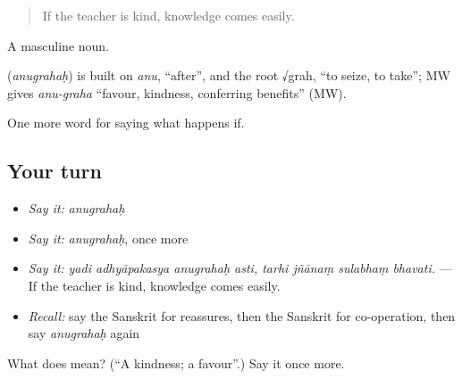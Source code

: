\begin{quote}
If the teacher is kind, knowledge comes easily.
\end{quote}

A masculine noun.

\begin{cousinweb}
\textbf{} (\emph{anugrahaḥ}) is built on \emph{anu}, \textquotedblleft{}after\textquotedblright{}, and the root √grah, \textquotedblleft{}to seize, to take\textquotedblright{}; MW gives \emph{anu-graha} \textquotedblleft{}favour, kindness, conferring benefits\textquotedblright{} (MW).
\end{cousinweb}

\begin{grammarlens}[title={What you've built}]
One more word for saying what happens if.
\end{grammarlens}

\subsection*{Your turn}
\begin{itemize}
\raggedright
  \item \emph{Say it:} \emph{anugrahaḥ}
  \item \emph{Say it:} \emph{anugrahaḥ}, once more
  \item \emph{Say it:} \emph{yadi adhyāpakasya anugrahaḥ asti, tarhi jñānaṃ sulabhaṃ bhavati.} — If the teacher is kind, knowledge comes easily.
  \item \emph{Recall:} say the Sanskrit for reassures, then the Sanskrit for co-operation, then say \emph{anugrahaḥ} again
\end{itemize}

\begin{tcolorbox}[breakable,colback=teal!4,colframe=teal!35!black,title={Before you move on}]
What does  mean? (\textquotedblleft{}A kindness; a favour\textquotedblright{}.) Say it once more.
\end{tcolorbox}
